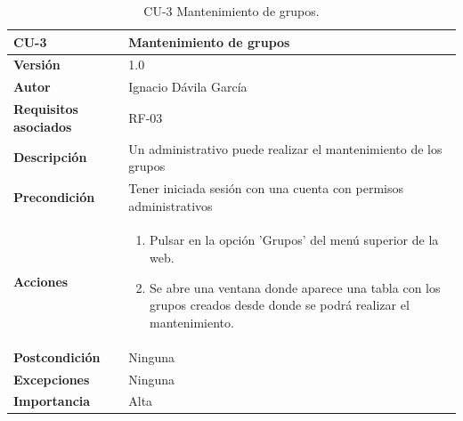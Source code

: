 \begin{table}[p]
	\centering
	\begin{tabularx}{\linewidth}{ p{} p{} }
		\toprule
		\textbf{CU-3}    & \textbf{Mantenimiento de grupos}\\
		\toprule
		\textbf{Versión}              & 1.0    \\
		\textbf{Autor}                & Ignacio Dávila García \\
		\textbf{Requisitos asociados} & RF-03 \\
		\textbf{Descripción}          & Un administrativo puede realizar el mantenimiento de los grupos \\
		\textbf{Precondición}         & Tener iniciada sesión con una cuenta con permisos administrativos \\
		\textbf{Acciones}             &
		\begin{enumerate}
			\def\labelenumi{\arabic{enumi}.}
			\tightlist
			\item Pulsar en la opción 'Grupos' del menú superior de la web.
			\item Se abre una ventana donde aparece una tabla con los grupos creados desde donde se podrá realizar el mantenimiento.
		\end{enumerate}\\
		\textbf{Postcondición}        & Ninguna \\
		\textbf{Excepciones}          & Ninguna \\
		\textbf{Importancia}          & Alta \\
		\bottomrule
	\end{tabularx}
	\caption{CU-3 Mantenimiento de grupos.}
\end{table}

